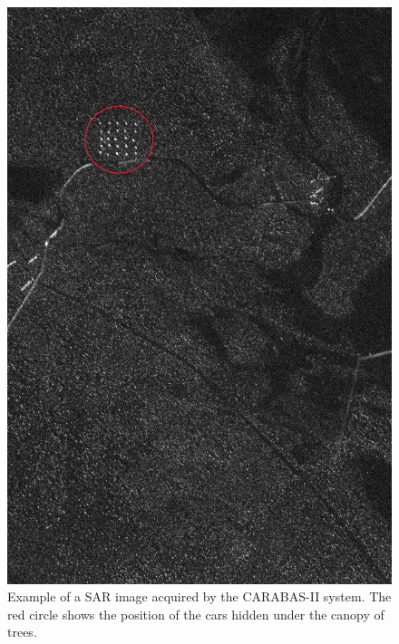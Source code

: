 \begin{figure}[H]
  \centering
  \includegraphics[width=0.8\linewidth]{Cap3-Results/exemplo_carabas.jpg}
  \caption{Example of a SAR image acquired by the CARABAS-II system.
  The red circle shows the position of the cars hidden under the canopy of trees.}
  \label{fig:carabas_example}
\end{figure}


